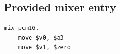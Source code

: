 \subsection{Provided mixer entry}
\begin{verbatim}
mix_pcm16:
    move $v0, $a3
    move $v1, $zero
\end{verbatim}

